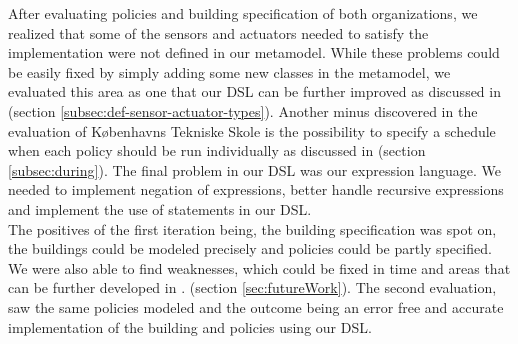 After evaluating policies and building specification of both organizations, we realized that some of the sensors and actuators needed to satisfy the implementation were not defined in our metamodel. While these problems could be easily fixed by simply adding some new classes in the metamodel, we evaluated this area as one that our DSL can be further improved as discussed in  (section \ref{subsec:def-sensor-actuator-types}). Another minus discovered in the evaluation of K\o benhavns Tekniske Skole is the possibility to specify a schedule when each policy should be run individually as discussed in  (section \ref{subsec:during}). The final problem in our DSL was our expression language. We needed to implement negation of expressions, better handle recursive expressions and implement the use of statements in our DSL.\\

The positives of the first iteration being, the building specification was spot on, the buildings could be modeled precisely and policies could be partly specified. We were also able to find weaknesses, which could be fixed in time and areas that can be further developed in . (section \ref{sec:futureWork}). The second evaluation, saw the same policies modeled and the outcome being an error free and accurate implementation of the building and policies using our DSL. 